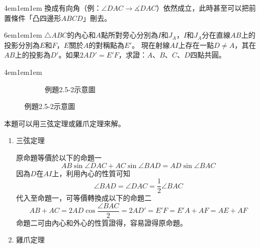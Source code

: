 \documentclass[12pt]{article}
\begin{document}
\begin{mybox}[回答]{4em}{1em}{1em}
    換成有向角（例：$\angle{DAC}\rightarrow\measuredangle{DAC}$）依然成立，此時甚至可以把前置條件「凸四邊形$ABCD$」刪去。
\end{mybox}
\begin{mybox}[例題\thesubsection-1]{6em}{1em}{1em}
    $\triangle{ABC}$的內心和$A$點所對旁心分別為$I$和$J_A$，$I$和$J_A$分在直線$AB$上的投影分別為$E$和$F$，$E$關於$A$的對稱點為$E'$。
    現在射線$AI$上存在一點$D\neq A$，其在$AB$上的投影為$D'$。如果$2AD'=E'F$，求證：$A$、$B$、$C$、$D$四點共圓。
\end{mybox}
\begin{mybox}[解答]{4em}{1em}{1em}
    \begin{figure}[H]
        \begin{subfigure}[b]{\textwidth}
            \centering  
            \label{fig:ttc_s2.5-2}
            \caption{例題2.5-2示意圖}
        \end{subfigure}  
    \end{figure}
    本題可以用三弦定理或雞爪定理來解。
    \begin{enumerate}[label = 方法 \arabic*：]
        \item 三弦定理
        
        原命題等價於以下的命題一
        $$
            AB\sin{\angle{DAC}} + AC\sin{\angle{BAD}} = AD\sin{\angle{BAC}}
        $$
        因為$D$在$AI$上，利用內心的性質可知
        $$
            \angle{BAD}=\angle{DAC}=\frac{1}{2}\angle{BAC}
        $$
        代入至命題一，可等價轉換成以下的命題二
        $$
            AB+AC=2AD\cos{\frac{\angle{BAC}}{2}}=2AD'=E'F=E'A+AF=AE+AF
        $$
        命題二可由內心和外心的性質證得，容易證得原命題。
        \item 雞爪定理
        

\end{enumerate}
\end{mybox}
\end{document}
